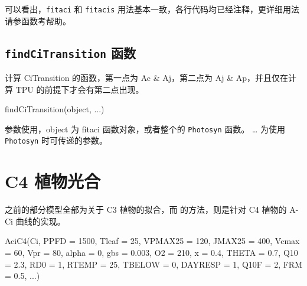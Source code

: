 \documentclass[
]{krantz}
\makeatletter
\newenvironment{Shaded}{\begin{snugshade}}{\end{snugshade}}
\newcommand{\AttributeTok}[1]{\textcolor[rgb]{0.77,0.63,0.00}{#1}}
\newcommand{\DecValTok}[1]{\textcolor[rgb]{0.00,0.00,0.81}{#1}}
\newcommand{\FloatTok}[1]{\textcolor[rgb]{0.00,0.00,0.81}{#1}}
\newcommand{\FunctionTok}[1]{\textcolor[rgb]{0.00,0.00,0.00}{#1}}
\newcommand{\NormalTok}[1]{#1}
\newenvironment{kframe}{%
\medskip{}
\setlength{\fboxsep}{.8em}
 \def\at@end@of@kframe{}%
 \ifinner\ifhmode%
  \def\at@end@of@kframe{\end{minipage}}%
  \begin{minipage}{\columnwidth}%
 \fi\fi%
 \def\FrameCommand##1{\hskip\@totalleftmargin \hskip-\fboxsep
 \colorbox{shadecolor}{##1}\hskip-\fboxsep
     \hskip-\linewidth \hskip-\@totalleftmargin \hskip\columnwidth}%
 \MakeFramed {\advance\hsize-\width
   \@totalleftmargin\z@ \linewidth\hsize
   \@setminipage}}%
 {\par\unskip\endMakeFramed%
 \at@end@of@kframe}
\renewenvironment{Shaded}{\begin{kframe}}{\end{kframe}}
\makeatother
\begin{document}
可以看出，\texttt{fitaci} 和 \texttt{fitacis} 用法基本一致，各行代码均已经注释，更详细用法请参函数考帮助。

\hypertarget{transition}{%
\subsection{\texorpdfstring{\texttt{findCiTransition} 函数}{findCiTransition 函数}}\label{transition}}

计算 CiTransition 的函数，第一点为 Ac \& Aj，第二点为 Aj \& Ap，并且仅在计算 TPU 的前提下才会有第二点出现。

\begin{Shaded}
\begin{Highlighting}[]
\FunctionTok{findCiTransition}\NormalTok{(object, ...)}
\end{Highlighting}
\end{Shaded}

参数使用，object 为 fitaci 函数对象，或者整个的 \texttt{Photosyn} 函数。
\ldots{} 为使用 \texttt{Photosyn} 时可传递的参数。

\cleardoublepage

\hypertarget{c4}{%
\section{C4 植物光合}\label{c4}}

之前的部分模型全部为关于 C3 植物的拟合，而 \citet{Caemmerer2000Biochemical} 的方法，则是针对
C4 植物的 A-Ci 曲线的实现。

\begin{Shaded}
\begin{Highlighting}[]
\FunctionTok{AciC4}\NormalTok{(Ci, }\AttributeTok{PPFD =} \DecValTok{1500}\NormalTok{, }\AttributeTok{Tleaf =} \DecValTok{25}\NormalTok{, }\AttributeTok{VPMAX25 =} \DecValTok{120}\NormalTok{, }
      \AttributeTok{JMAX25 =} \DecValTok{400}\NormalTok{, }\AttributeTok{Vcmax =} \DecValTok{60}\NormalTok{, }\AttributeTok{Vpr =} \DecValTok{80}\NormalTok{, }
      \AttributeTok{alpha =} \DecValTok{0}\NormalTok{, }\AttributeTok{gbs =} \FloatTok{0.003}\NormalTok{, }\AttributeTok{O2 =} \DecValTok{210}\NormalTok{, }
      \AttributeTok{x =} \FloatTok{0.4}\NormalTok{, }\AttributeTok{THETA =} \FloatTok{0.7}\NormalTok{, }\AttributeTok{Q10 =} \FloatTok{2.3}\NormalTok{, }
      \AttributeTok{RD0 =} \DecValTok{1}\NormalTok{, }\AttributeTok{RTEMP =} \DecValTok{25}\NormalTok{, }\AttributeTok{TBELOW =} \DecValTok{0}\NormalTok{, }
      \AttributeTok{DAYRESP =} \DecValTok{1}\NormalTok{, }\AttributeTok{Q10F =} \DecValTok{2}\NormalTok{, }\AttributeTok{FRM =} \FloatTok{0.5}\NormalTok{, ...)}
\end{Highlighting}
\end{Shaded}
\end{document}
